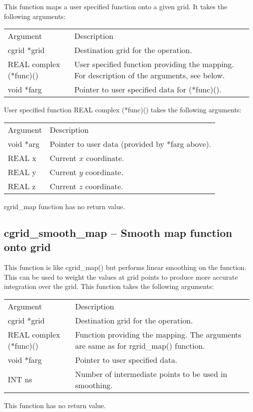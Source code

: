 \documentclass[12pt,letterpaper]{report}
\begin{document}
This function maps a user specified function onto a given grid. It takes the following arguments:
\begin{longtable}{p{} p{}}
Argument & Description\\
\cline{1-2}
cgrid *grid & Destination grid for the operation.\\
REAL complex (*func)() & User specified function providing the mapping. For description of the arguments, see below.\\
void *farg & Pointer to user specified data for (*func)().\\
\end{longtable}
User specified function REAL complex (*func)() takes the following arguments:
\begin{longtable}{p{} p{}}
Argument & Description\\
\cline{1-2}
void *arg & Pointer to user data (provided by *farg above).\\
REAL x & Current $x$ coordinate.\\
REAL y & Current $y$ coordinate.\\
REAL z & Current $z$ coordinate.\\
\end{longtable}
\noindent
rgrid\_map function has no return value.

\subsection{cgrid\_smooth\_map -- Smooth map function onto grid}

This function is like cgrid\_map() but performs linear smoothing on the function. This can be used to weight the values at grid points to produce more accurate integration over the grid. This function takes the following arguments:
\begin{longtable}{p{} p{}}
Argument & Description\\
\cline{1-2}
cgrid *grid & Destination grid for the operation.\\
REAL complex (*func)() & Function providing the mapping. The arguments are same as for rgrid\_map() function.\\
void *farg & Pointer to user specified data.\\
INT ns & Number of intermediate points to be used in smoothing.\\
\end{longtable}
\noindent
This function has no return value.
\end{document}
